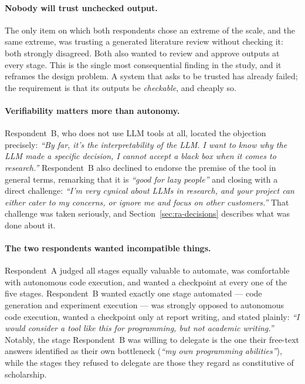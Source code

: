 \paragraph{Nobody will trust unchecked output.} The only item on which both respondents chose
an extreme of the scale, and the same extreme, was trusting a generated literature review
without checking it: both strongly disagreed. Both also wanted to review and approve outputs at
every stage. This is the single most consequential finding in the study, and it reframes the
design problem. A system that asks to be trusted has already failed; the requirement is that
its outputs be \emph{checkable}, and cheaply so.

\paragraph{Verifiability matters more than autonomy.} Respondent~B, who does not use LLM tools
at all, located the objection precisely: \emph{``By far, it's the interpretability of the LLM.
I want to know why the LLM made a specific decision, I cannot accept a black box when it comes
to research.''} Respondent~B also declined to endorse the premise of the tool in general
terms, remarking that it is \emph{``good for lazy people''} and closing with a direct
challenge: \emph{``I'm very cynical about LLMs in research, and your project can either cater
to my concerns, or ignore me and focus on other customers.''} That challenge was taken
seriously, and Section~\ref{sec:ra-decisions} describes what was done about it.

\paragraph{The two respondents wanted incompatible things.} Respondent~A judged all stages
equally valuable to automate, was comfortable with autonomous code execution, and wanted a
checkpoint at every one of the five stages. Respondent~B wanted exactly one stage automated
--- code generation and experiment execution --- was strongly opposed to autonomous code
execution, wanted a checkpoint only at report writing, and stated plainly: \emph{``I would
consider a tool like this for programming, but not academic writing.''} Notably, the stage
Respondent~B was willing to delegate is the one their free-text answers identified as their
own bottleneck (\emph{``my own programming abilities''}), while the stages they refused to
delegate are those they regard as constitutive of scholarship.

